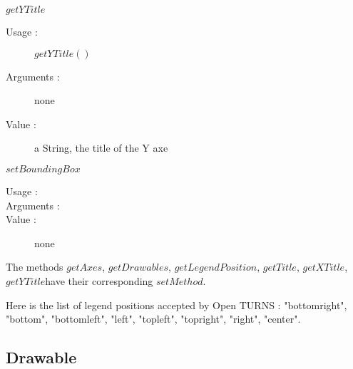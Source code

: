 \begin{description}
\begin{description}
  \item $getYTitle$
    \begin{description}
    \item[Usage :] $getYTitle()$
    \item[Arguments :] none
    \item[Value :] a String, the title of the Y axe
    \end{description}
    \bigskip

  \item $setBoundingBox$
    \begin{description}
    \item[Usage :] \rule{0pt}{1em}
    \item[Arguments :]  \rule{0pt}{1em}
    \item[Value :] none
    \end{description}
  \end{description}

  The methods $getAxes$, $getDrawables$,  $getLegendPosition$,  $getTitle$,  $getXTitle$,  $getYTitle$have their corresponding $setMethod$.

\end{description}

Here is the list of legend positions accepted by Open TURNS : "bottomright", "bottom", "bottomleft", "left", "topleft", "topright", "right", "center".


\newpage \subsection{Drawable}

